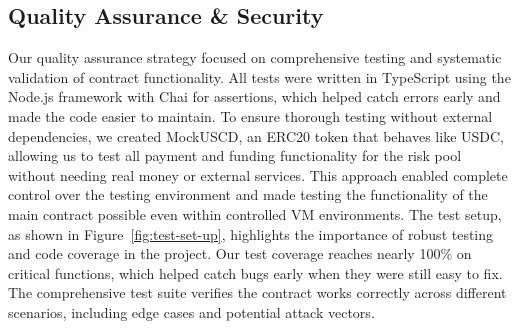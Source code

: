 \documentclass[11pt,a4paper]{article}
\begin{document}
	\subsection{Quality Assurance \& Security}\label{subsec:qa-security}
	Our quality assurance strategy focused on comprehensive testing and systematic validation of contract functionality.
	All tests were written in TypeScript using the Node.js framework with Chai for assertions, which helped catch errors early and made the code easier to maintain.
	To ensure thorough testing without external dependencies, we created MockUSCD, an ERC20 token that behaves like USDC, allowing us to test all payment and funding functionality for the risk pool without needing real money or external services.
	This approach enabled complete control over the testing environment and made testing the functionality of the main contract possible even within controlled VM environments.
	The test setup, as shown in Figure~\ref{fig:test-set-up}, highlights the importance of robust testing and code coverage in the project.
	Our test coverage reaches nearly 100\% on critical functions, which helped catch bugs early when they were still easy to fix.
	The comprehensive test suite verifies the contract works correctly across different scenarios, including edge cases and potential attack vectors.
\end{document}
